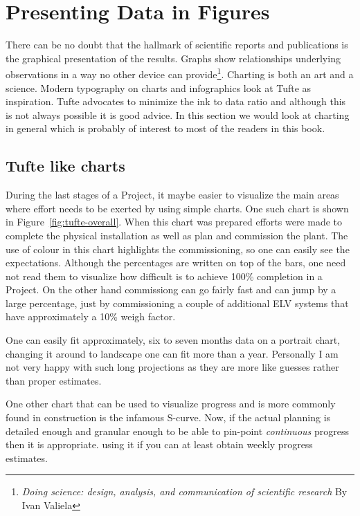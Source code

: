 \chapter{Presenting Data in Figures}
There can be no doubt that the hallmark of scientific reports and publications is the graphical presentation of the results. Graphs show relationships underlying observations in a way no other device can provide\footnote{\textit{Doing science: design, analysis, and communication of scientific research}
 By Ivan Valiela}. 
Charting is both an art and a science. Modern typography on charts and infographics look at Tufte as inspiration.
Tufte advocates to minimize the ink to data ratio and although this is not always possible it is good advice.
In this section we would look at charting in general which is probably of interest to most of the readers
in this book. 

\section{Tufte like charts}

During the last stages of a Project, it maybe easier to visualize the
main areas where effort needs to be exerted by using simple charts. One
such chart is shown in Figure~\ref{fig:tufte-overall}. When this chart
was prepared efforts were made to complete the physical installation
as well as plan and commission the plant. The use of colour in this
chart highlights the commissioning, so one can easily see the expectations. Although the percentages are written on top of the bars,
one need not read them to visualize how difficult is to achieve
100\% completion in a Project. On the other hand commissiong can go
fairly fast and can jump by a large percentage, just by
commissioning a couple of additional ELV systems that have approximately
a 10\% weigh factor.

One can easily fit approximately, six to seven months data on
a portrait chart, changing it around to landscape one can fit
more than a year. Personally I am not very happy with such long
projections as they are more like guesses rather than proper estimates.

One other chart that can be used to visualize progress and is more
commonly found in construction is the infamous S-curve. Now, if
the actual planning is detailed enough and granular enough to be
able to pin-point \textit{continuous} progress then it is
appropriate. using it if you can at least obtain weekly progress
estimates.



